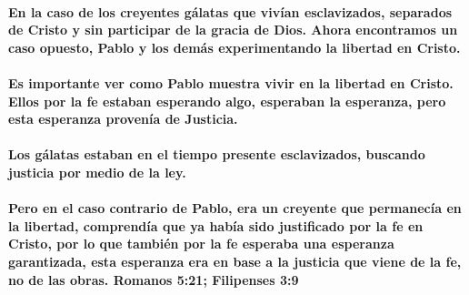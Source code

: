\documentclass[11a pt,twoside]{article}
\let\oldparagraph\paragraph
\renewcommand{\paragraph}{\needspace{3\baselineskip}\oldparagraph}
\begin{document}
\paragraph{En la caso de los creyentes gálatas que vivían esclavizados,
separados de Cristo y sin participar de la gracia de Dios. Ahora
encontramos un caso opuesto, Pablo y los demás experimentando la
libertad en
Cristo.}\label{en-la-caso-de-los-creyentes-guxe1latas-que-vivuxedan-esclavizados-separados-de-cristo-y-sin-participar-de-la-gracia-de-dios.-ahora-encontramos-un-caso-opuesto-pablo-y-los-demuxe1s-experimentando-la-libertad-en-cristo.}

\paragraph{Es importante ver como Pablo muestra vivir en la libertad en
Cristo. Ellos por la fe estaban esperando algo, esperaban la esperanza,
pero esta esperanza provenía de
Justicia.}\label{es-importante-ver-como-pablo-muestra-vivir-en-la-libertad-en-cristo.-ellos-por-la-fe-estaban-esperando-algo-esperaban-la-esperanza-pero-esta-esperanza-provenuxeda-de-justicia.}

\paragraph{Los gálatas estaban en el tiempo presente esclavizados,
buscando justicia por medio de la
ley.}\label{los-guxe1latas-estaban-en-el-tiempo-presente-esclavizados-buscando-justicia-por-medio-de-la-ley.}

\paragraph{Pero en el caso contrario de Pablo, era un creyente que
permanecía en la libertad, comprendía que ya había sido justificado por
la fe en Cristo, por lo que también por la fe esperaba una esperanza
garantizada, esta esperanza era en base a la justicia que viene de la
fe, no de las obras. Romanos 5:21; Filipenses
3:9}\label{pero-en-el-caso-contrario-de-pablo-era-un-creyente-que-permanecuxeda-en-la-libertad-comprenduxeda-que-ya-habuxeda-sido-justificado-por-la-fe-en-cristo-por-lo-que-tambiuxe9n-por-la-fe-esperaba-una-esperanza-garantizada-esta-esperanza-era-en-base-a-la-justicia-que-viene-de-la-fe-no-de-las-obras.-romanos-521-filipenses-39}
\end{document}
